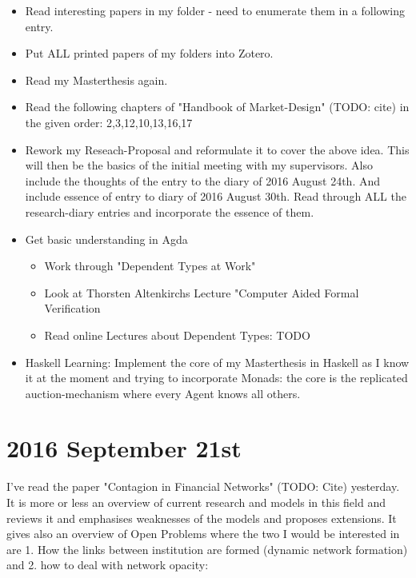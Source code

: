 \begin{itemize}
\item Read interesting papers in my folder - need to enumerate them in a following entry.
\item Put ALL printed papers of my folders into Zotero. 
\item Read my Masterthesis again.
\item Read the following chapters of "Handbook of Market-Design" (TODO: cite) in the given order: 2,3,12,10,13,16,17
\item Rework my Reseach-Proposal and reformulate it to cover the above idea. 
This will then be the basics of the initial meeting with my supervisors. Also include the thoughts of the entry to the diary of 2016 August 24th. And include essence of entry to diary of 2016 August 30th. Read through ALL the research-diary entries and incorporate the essence of them.
\item Get basic understanding in Agda 
	\begin{itemize}
	\item Work through "Dependent Types at Work"
	\item Look at Thorsten Altenkirchs Lecture "Computer Aided Formal Verification
	\item Read online Lectures about Dependent Types: TODO
	\end{itemize}
\item Haskell Learning: Implement the core of my Masterthesis in Haskell as I know it at the moment and trying to incorporate Monads: the core is the replicated auction-mechanism where every Agent knows all others.
\end{itemize}

\section*{2016 September 21st}
I've read the paper "Contagion in Financial Networks" (TODO: Cite) yesterday. \\

It is more or less an overview of current research and models in this field and reviews it and emphasises weaknesses of the models and proposes extensions. It gives also an overview of Open Problems where the two I would be interested in are 1. How the links between institution are formed (dynamic network formation) and 2. how to deal with network opacity:

